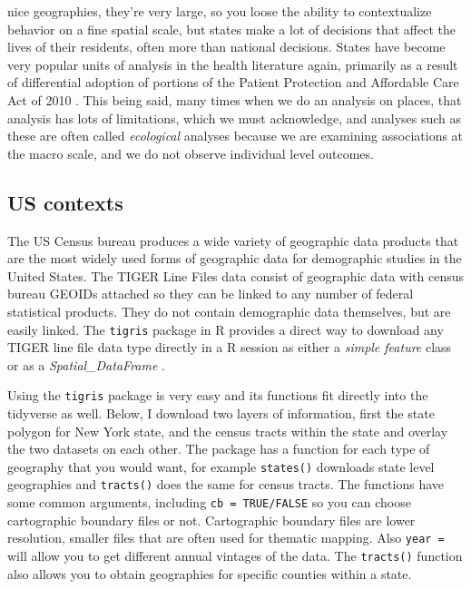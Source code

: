 \documentclass[
]{article}
\begin{document}
nice geographies, they're very large, so you loose the ability to contextualize behavior on a fine spatial scale, but states make a lot of decisions that affect the lives of their residents, often more than national decisions. States have become very popular units of analysis in the health literature again, primarily as a result of differential adoption of portions of the Patient Protection and Affordable Care Act of 2010 \citep{soni2017a, courtemanche2019}. This being said, many times when we do an analysis on places, that analysis has lots of limitations, which we must acknowledge, and analyses such as these are often called \emph{ecological} analyses because we are examining associations at the macro scale, and we do not observe individual level outcomes.

\hypertarget{us-contexts}{%
\subsection{US contexts}\label{us-contexts}}

The US Census bureau produces a wide variety of geographic data products that are the most widely used forms of geographic data for demographic studies in the United States. The TIGER Line Files data consist of geographic data with census bureau GEOIDs attached so they can be linked to any number of federal statistical products. They do not contain demographic data themselves, but are easily linked. The \texttt{tigris} package in R provides a direct way to download any TIGER line file data type directly in a R session as either a \emph{simple feature} class or as a \emph{Spatial\_DataFrame} \citep{tigris}.

Using the \texttt{tigris} package is very easy and its functions fit directly into the tidyverse as well. Below, I download two layers of information, first the state polygon for New York state, and the census tracts within the state and overlay the two datasets on each other. The package has a function for each type of geography that you would want, for example \texttt{states()} downloads state level geographies and \texttt{tracts()} does the same for census tracts. The functions have some common arguments, including \texttt{cb\ =\ TRUE/FALSE} so you can choose cartographic boundary files or not. Cartographic boundary files are lower resolution, smaller files that are often used for thematic mapping. Also \texttt{year\ =} will allow you to get different annual vintages of the data. The \texttt{tracts()} function also allows you to obtain geographies for specific counties within a state.
\end{document}
